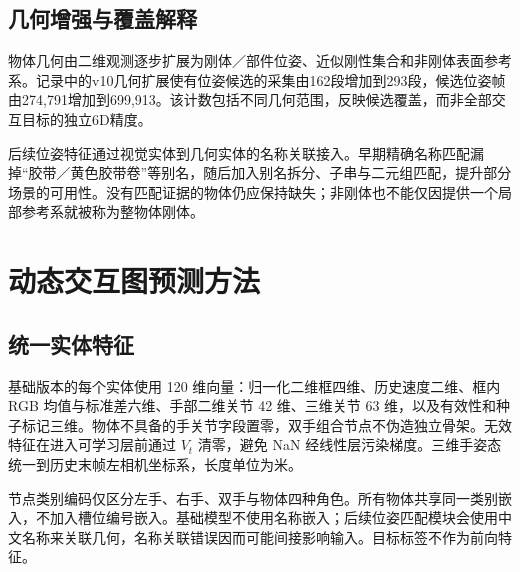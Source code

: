 \documentclass[10pt,twocolumn,letterpaper]{article}
\begin{document}
\subsection{几何增强与覆盖解释}
物体几何由二维观测逐步扩展为刚体／部件位姿、近似刚性集合和非刚体表面参考系。记录中的v10几何扩展使有位姿候选的采集由162段增加到293段，候选位姿帧由274,791增加到699,913。该计数包括不同几何范围，反映候选覆盖，而非全部交互目标的独立6D精度。

后续位姿特征通过视觉实体到几何实体的名称关联接入。早期精确名称匹配漏掉“胶带／黄色胶带卷”等别名，随后加入别名拆分、子串与二元组匹配，提升部分场景的可用性。没有匹配证据的物体仍应保持缺失；非刚体也不能仅因提供一个局部参考系就被称为整物体刚体。
\section{动态交互图预测方法}
\subsection{统一实体特征}
基础版本的每个实体使用 120 维向量：归一化二维框四维、历史速度二维、框内 RGB 均值与标准差六维、手部二维关节 42 维、三维关节 63 维，以及有效性和种子标记三维。物体不具备的手关节字段置零，双手组合节点不伪造独立骨架。无效特征在进入可学习层前通过 $V_t$ 清零，避免 NaN 经线性层污染梯度。三维手姿态统一到历史末帧左相机坐标系，长度单位为米。

节点类别编码仅区分左手、右手、双手与物体四种角色。所有物体共享同一类别嵌入，不加入槽位编号嵌入。基础模型不使用名称嵌入；后续位姿匹配模块会使用中文名称来关联几何，名称关联错误因而可能间接影响输入。目标标签不作为前向特征。
\end{document}
